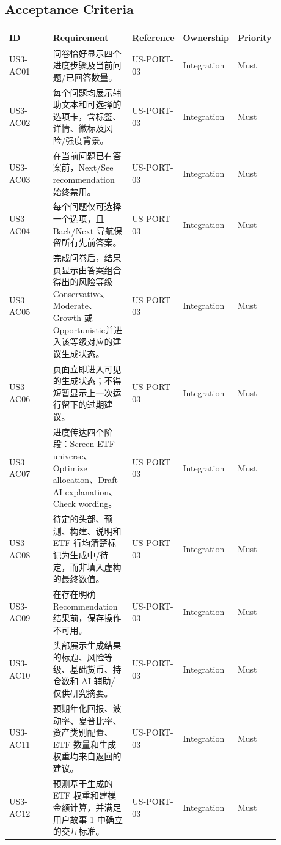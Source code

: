 \subsection{Acceptance Criteria}
\begingroup
\small
\begin{longtable}{L{0.18\linewidth}L{0.30\linewidth}L{0.18\linewidth}L{0.12\linewidth}L{0.10\linewidth}}
\toprule
\textbf{ID} & \textbf{Requirement} & \textbf{Reference} & \textbf{Ownership} & \textbf{Priority} \\
\midrule
US3-AC01 & 问卷恰好显示四个进度步骤及当前问题/\allowbreak{}已回答数量。 & US-PORT-03 & Integration & Must \\
US3-AC02 & 每个问题均展示辅助文本和可选择的选项卡，含标签、详情、徽标及风险/\allowbreak{}强度背景。 & US-PORT-03 & Integration & Must \\
US3-AC03 & 在当前问题已有答案前，Next/\allowbreak{}See recommendation 始终禁用。 & US-PORT-03 & Integration & Must \\
US3-AC04 & 每个问题仅可选择一个选项，且 Back/\allowbreak{}Next 导航保留所有先前答案。 & US-PORT-03 & Integration & Must \\
US3-AC05 & 完成问卷后，结果页显示由答案组合得出的风险等级\textemdash{}\textemdash{}Conservative、Moderate、Growth 或 Opportunistic\textemdash{}\textemdash{}并进入该等级对应的建议生成状态。 & US-PORT-03 & Integration & Must \\
US3-AC06 & 页面立即进入可见的生成状态；不得短暂显示上一次运行留下的过期建议。 & US-PORT-03 & Integration & Must \\
US3-AC07 & 进度传达四个阶段：Screen ETF universe、Optimize allocation、Draft AI explanation、Check wording。 & US-PORT-03 & Integration & Must \\
US3-AC08 & 待定的头部、预测、构建、说明和 ETF 行均清楚标记为生成中/\allowbreak{}待定，而非填入虚构的最终数值。 & US-PORT-03 & Integration & Must \\
US3-AC09 & 在存在明确 Recommendation 结果前，保存操作不可用。 & US-PORT-03 & Integration & Must \\
US3-AC10 & 头部展示生成结果的标题、风险等级、基础货币、持仓数和 AI 辅助/\allowbreak{}仅供研究摘要。 & US-PORT-03 & Integration & Must \\
US3-AC11 & 预期年化回报、波动率、夏普比率、资产类别配置、ETF 数量和生成权重均来自返回的建议。 & US-PORT-03 & Integration & Must \\
US3-AC12 & 预测基于生成的 ETF 权重和建模金额计算，并满足用户故事 1 中确立的交互标准。 & US-PORT-03 & Integration & Must \\

\end{longtable}

